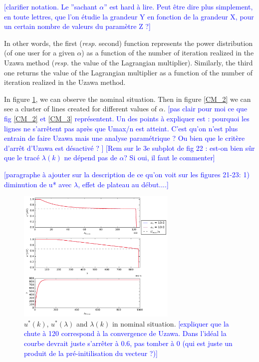 \documentclass[conference]{IEEEtran}
\newcommand{\rem}[1]{\textcolor{blue}{[#1]}}
\begin{document}
\rem{clarifier notation. Le ''sachant $\alpha$'' est hard à lire. Peut être dire plus simplement, en toute lettres, que l'on étudie la grandeur Y en fonction de la grandeur X, pour un certain nombre de valeurs du paramètre Z ?}

In other words, the first (\textit{resp.} second) function represents the power distribution (of one user for a given $\alpha$) as a function of the number of iteration realized in the Uzawa method (\textit{resp.} the value of the Lagrangian multiplier). Similarly, the third one returns the value of the Lagrangian multiplier as a function of the number of iteration realized in the Uzawa method. 

In figure \ref{CM_1}, we can observe the nominal situation. Then in figure \ref{CM_2} we can see a cluster of lines created for different values of $\alpha$.
\rem{pas clair pour moi ce que fig \ref{CM_2} et \ref{CM_3} représentent. Un des points à expliquer est : pourquoi les lignes ne s'arrêtent pas après que Umax/n est atteint. C'est qu'on n'est plus entrain de faire Uzawa mais une analyse paramétrique ? Ou bien que le critère d'arrêt d'Uzawa est désactivé ? }
\rem{Rem sur le  3e subplot de fig 22 : est-on bien sûr que le tracé $\lambda(k)$ ne dépend pas de $\alpha$? Si oui, il faut le commenter}


\rem{paragraphe à ajouter sur la description de ce qu'on voit sur les figures 21-23: 1) diminution de u* avec $\lambda$, effet de plateau au début....}

\begin{figure}[!t]
\centering
\includegraphics[width=3in]{KL_init.pdf}
\caption{$u^*(k)$, $u^*(\lambda)$ and $\lambda(k)$ in nominal situation. \rem{expliquer que la chute à 120 correspond à la convergence de Uzawa. Dans l'idéal la courbe devrait juste s'arrêter à 0.6, pas tomber à 0 (qui est juste un produit de la pré-initilisation du vecteur ?)}}
\label{CM_1}
\end{figure}
\end{document}

